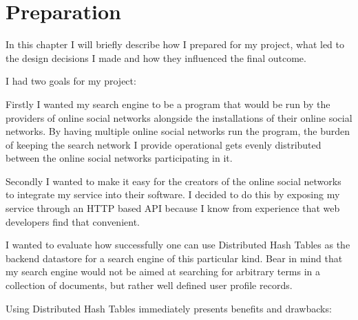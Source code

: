 

\section{Preparation}

In this chapter I will briefly describe how I prepared for my project, what led to the design decisions I made and how they influenced the final outcome.

\mbox{} %


I had two goals for my project:

Firstly I wanted my search engine to be a program that would be run by the providers of online social networks alongside the installations of their online social networks.
By having multiple online social networks run the program, the burden of keeping the search network I provide operational gets evenly distributed between the online social networks participating in it. 

Secondly I wanted to make it easy for the creators of the online social networks to integrate my service into their software.
I decided to do this by exposing my service through an HTTP based API because I know from experience that web developers find that convenient. 

% 

I wanted to evaluate how successfully one can use Distributed Hash Tables as the backend datastore for a search engine of this particular kind. Bear in mind that my search engine would not be aimed at searching for arbitrary terms in a collection of documents, but rather well defined user profile records. 

Using Distributed Hash Tables immediately presents benefits and drawbacks: 

